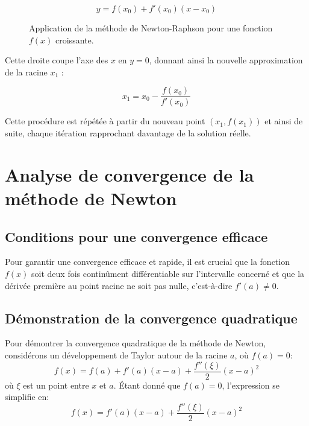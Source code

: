 \documentclass{article}
\begin{document}
\[ y = f(x_0) + f'(x_0)(x - x_0) \]

\begin{figure}[h!]
\caption{Application de la méthode de Newton-Raphson pour une fonction  \( f(x) \) croissante.}
\end{figure}
Cette droite coupe l'axe des \( x \) en \( y = 0 \), donnant ainsi la nouvelle approximation de la racine \( x_1 \) :

\[ x_1 = x_0 - \frac{f(x_0)}{f'(x_0)} \]

Cette procédure est répétée à partir du nouveau point \((x_1, f(x_1))\) et ainsi de suite, chaque itération rapprochant davantage de la solution réelle.

\section{Analyse de convergence de la méthode de Newton}
\subsection{Conditions pour une convergence efficace}
Pour garantir une convergence efficace et rapide, il est crucial que la fonction \( f(x) \) soit deux fois continûment différentiable sur l'intervalle concerné et que la dérivée première au point racine ne soit pas nulle, c’est-à-dire \( f'(a) \neq 0 \).

\subsection{Démonstration de la convergence quadratique}
Pour démontrer la convergence quadratique de la méthode de Newton, considérons un développement de Taylor autour de la racine \( a \), où \( f(a) = 0 \):
\[ f(x) = f(a) + f'(a)(x - a) + \frac{f''(\xi)}{2}(x - a)^2 \]
où \( \xi \) est un point entre \( x \) et \( a \). Étant donné que \( f(a) = 0 \), l'expression se simplifie en:
\[ f(x) = f'(a)(x - a) + \frac{f''(\xi)}{2}(x - a)^2 \]
\end{document}
